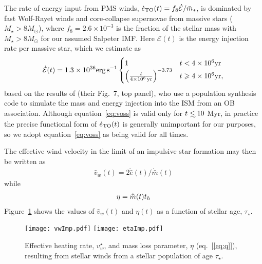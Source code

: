 The rate of energy input from PMS winds, $\dot{e}_{\rm TO}(t) = f_{8}\dot{\mathcal{E}}/\bar{m}_*$, is dominated by fast Wolf-Rayet winds and core-collapse supernovae from massive stars ($M_{\star} > 8M_{\odot}$), where $f_{8} =2.6 \times 10^{-3}$ is the fraction of the stellar mass with $M_{\star} > 8M_{\odot}$ for our assumed Salpeter IMF.  Here $\dot{\mathcal{E}} (t)$ is the energy injection rate per massive star, which we estimate as
\begin{align}
\dot{\mathcal{E}} (t)=  1.3 \times 10^{36} {\rm erg\,s^{-1}}
\begin{cases}
  1 & t<4 \times 10^6 {\rm yr}\\
  \left(\frac{t}{4 \times  10^6\,{\rm yr}}\right)^{-3.73} & t \ge 4 \times 10^6 {\rm yr},
\end{cases}
\label{eq:voss}
\end{align}
based on the results of \citet{VossDiehl+:2009a} (their Fig.~7, top panel), who use a population synthesis code to simulate the mass and energy injection into the ISM from an OB association.  Although equation~\eqref{eq:voss} is valid only for $t \lsim 10$ Myr, in practice the precise functional form of $\dot{e}_{\rm TO}(t)$ is generally unimportant for our purposes, so we adopt equation~\eqref{eq:voss} as being valid for all times.


The effective wind velocity in the limit of an impulsive star formation may then be written
as 
\begin{align}
\bar{v}_w(t)=2 \dot{\bar{e}}(t)/\dot{\bar{m}}(t)
\label{eq:vwImp}
\end{align}
while 
\begin{align}
\eta = \dot{\bar{m}}(t) \th
\label{eq:etaImp}
\end{align}
 Figure~\ref{fig:vwImp} shows the values of $\bar{v}_w(t)$ and $\eta(t)$ as a function of stellar age, $\tau_{\star}$.

\begin{figure}
\texttt{[image: vwImp.pdf]}
\texttt{[image: etaImp.pdf]}
\caption{\label{fig:vwImp} Effective heating rate, $v_w^{\star}$, and mass loss parameter, $\eta$ (eq.~[\ref{eq:q}]), resulting from stellar winds from a stellar population of age $\tau_{\star}$.}
\end{figure}



